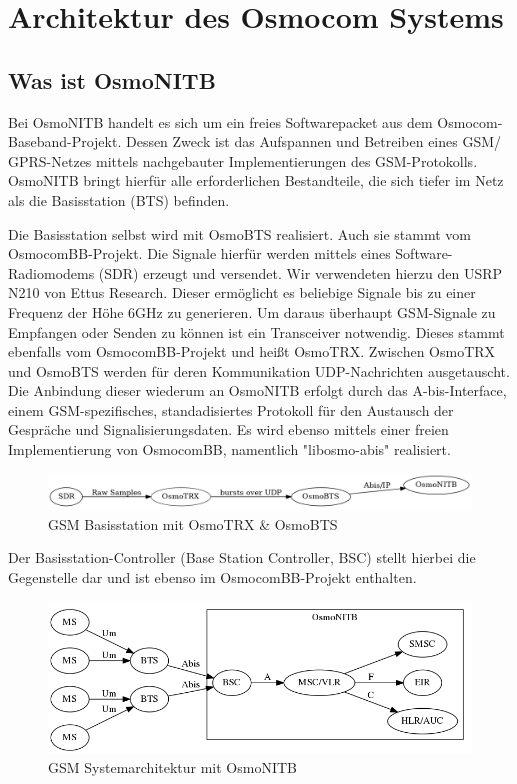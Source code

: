 \section{Architektur des Osmocom Systems}


\subsection{Was ist OsmoNITB}
Bei OsmoNITB handelt es sich um ein freies Softwarepacket aus dem Osmocom-Baseband-Projekt. Dessen Zweck ist das Aufspannen und Betreiben eines GSM/ GPRS-Netzes mittels nachgebauter Implementierungen des GSM-Protokolls. OsmoNITB bringt hierfür alle erforderlichen Bestandteile, die sich tiefer im Netz als die Basisstation (BTS) befinden. 

Die Basisstation selbst wird mit OsmoBTS realisiert. Auch sie stammt vom OsmocomBB-Projekt. Die Signale hierfür werden mittels eines Software-Radiomodems (SDR) erzeugt und versendet. Wir verwendeten hierzu den USRP N210 von Ettus Research. Dieser ermöglicht es beliebige Signale bis zu einer Frequenz der Höhe 6GHz zu generieren. Um daraus überhaupt GSM-Signale zu Empfangen oder Senden zu können ist ein Transceiver notwendig. Dieses stammt ebenfalls vom OsmocomBB-Projekt und heißt OsmoTRX. Zwischen OsmoTRX und OsmoBTS werden für deren Kommunikation UDP-Nachrichten ausgetauscht. Die Anbindung dieser wiederum an OsmoNITB erfolgt durch das A-bis-Interface, einem GSM-spezifisches, standadisiertes Protokoll für den Austausch der Gespräche und Signalisierungsdaten. Es wird ebenso mittels einer freien Implementierung von OsmocomBB, namentlich "libosmo-abis" realisiert.  


\begin{figure}[h]
    \centering
    \includegraphics[width=15cm]{includes/osmotrx}
    \caption{GSM Basisstation mit OsmoTRX & OsmoBTS}
	\label{fig:osmotrx}
\end{figure}


Der Basisstation-Controller (Base Station Controller, BSC) stellt hierbei die Gegenstelle dar und ist ebenso im OsmocomBB-Projekt enthalten. 




\begin{figure}[h]
    \centering
    \includegraphics[width=15cm]{includes/osmonitb}
    \caption{GSM Systemarchitektur mit OsmoNITB}
	\label{fig:osmonitb}
\end{figure}



